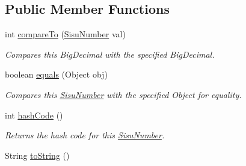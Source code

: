 \subsection*{Public Member Functions}
\begin{DoxyCompactItemize}
\item 
int \hyperlink{classcom_1_1aarrelaakso_1_1drawl_1_1_sisu_number_ac181aa40a51f66d059e9c612e7c67ff3}{compare\+To} (\hyperlink{classcom_1_1aarrelaakso_1_1drawl_1_1_sisu_number}{Sisu\+Number} val)
\begin{DoxyCompactList}\small\item\em Compares this Big\+Decimal with the specified Big\+Decimal. \end{DoxyCompactList}\item 
boolean \hyperlink{classcom_1_1aarrelaakso_1_1drawl_1_1_sisu_number_a8f5579e8b2e077ead4147751e7ab27ce}{equals} (Object obj)
\begin{DoxyCompactList}\small\item\em Compares this \hyperlink{classcom_1_1aarrelaakso_1_1drawl_1_1_sisu_number}{Sisu\+Number} with the specified Object for equality. \end{DoxyCompactList}\item 
int \hyperlink{classcom_1_1aarrelaakso_1_1drawl_1_1_sisu_number_a84f5852d7f79f865cc51d710d09b7032}{hash\+Code} ()
\begin{DoxyCompactList}\small\item\em Returns the hash code for this \hyperlink{classcom_1_1aarrelaakso_1_1drawl_1_1_sisu_number}{Sisu\+Number}. \end{DoxyCompactList}\item 
String \hyperlink{classcom_1_1aarrelaakso_1_1drawl_1_1_sisu_number_a0ed133b435cf93b55afbecb6d28e6cd6}{to\+String} ()
\end{DoxyCompactItemize}

